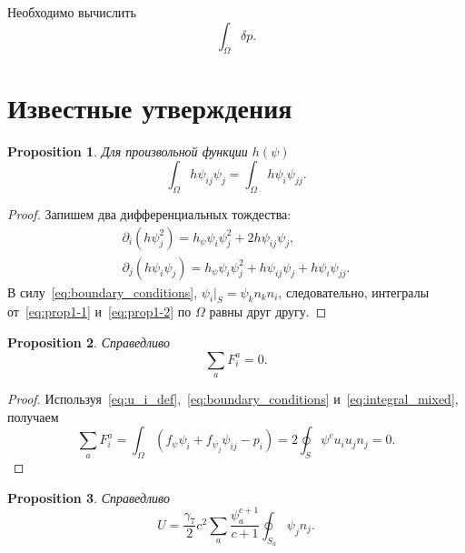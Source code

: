 \documentclass{article}
\newtheorem{proposition}{Proposition}
\begin{document}
Необходимо вычислить
\begin{equation}\label{eq:problem}
    \int_\Omega \delta p.
\end{equation}

\section{Известные утверждения}

\begin{proposition}\label{prop:integral_mixed}
Для произвольной функции \(h(\psi)\)
\begin{equation}\label{eq:integral_mixed}
    \int_\Omega h \psi_{ij} \psi_j = \int_\Omega h \psi_i \psi_{jj}.
\end{equation}
\end{proposition}

\begin{proof}
Запишем два дифференциальных тождества:
\begin{gather}
    \partial_i\left( h\psi_j^2 \right) = h_\psi\psi_i\psi_j^2 + 2h\psi_{ij}\psi_j, \label{eq:prop1-1}\\
    \partial_j\left( h\psi_i\psi_j \right) = h_\psi\psi_i\psi_j^2 + h\psi_{ij}\psi_j + h\psi_i\psi_{jj}. \label{eq:prop1-2}
\end{gather}
В силу~\eqref{eq:boundary_conditions}, \(\psi_i|_S = \psi_k n_k n_i\), следовательно,
интегралы от~\eqref{eq:prop1-1} и~\eqref{eq:prop1-2} по \(\Omega\) равны друг другу.
\end{proof}

\begin{proposition}\label{prop:sum_forces}
Справедливо
\begin{equation}\label{eq:sum_forces}
    \sum_a F_i^a = 0.
\end{equation}
\end{proposition}

\begin{proof}
Используя~\eqref{eq:u_i_def},~\eqref{eq:boundary_conditions} и~\eqref{eq:integral_mixed}, получаем
\[
    \sum_a F_i^a = \int_\Omega \left( f_\psi\psi_i + f_{\psi_j}\psi_{ij} - p_i \right) =
    2\oint_S \psi^c u_i u_j n_j = 0.
\]
\end{proof}

\begin{proposition}\label{prop:energy_psi}
Справедливо
\begin{equation}\label{eq:energy_psi}
    U = \frac{\gamma_7}{2}c^2 \sum_a \frac{\psi_a^{c+1}}{c+1} \oint_{S_a} \psi_j n_j.
\end{equation}
\end{proposition}
\end{document}
